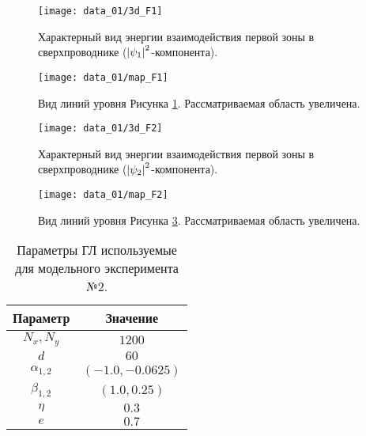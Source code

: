 \begin{figure}[h!]
    \center
    \texttt{[image: data\_01/3d\_F1]}
    \caption{Характерный вид энергии взаимодействия первой зоны в 
        сверхпроводнике (\( \left| \psi_1 \right|^2 \)-компонента).}
    \label{img:3d-band-1-01}
\end{figure}

\begin{figure}[h!]
    \center
    \texttt{[image: data\_01/map\_F1]}
    \caption{Вид линий уровня Рисунка \ref{img:3d-band-1-01}. 
        Рассматриваемая область увеличена.}
    \label{img:map-band-1-01}
\end{figure}

\begin{figure}[h!]
    \center
    \texttt{[image: data\_01/3d\_F2]}
    \caption{Характерный вид энергии взаимодействия первой зоны в 
        сверхпроводнике (\( \left| \psi_2 \right|^2 \)-компонента).}
    \label{img:3d-band-2-01}
\end{figure}

\begin{figure}[h!]
    \center
    \texttt{[image: data\_01/map\_F2]}
    \caption{Вид линий уровня Рисунка \ref{img:3d-band-2-01}. 
        Рассматриваемая область увеличена.}
    \label{img:map-band-2-01}
\end{figure}

\clearpage


\begin{table}[h!]
    \centering
    \begin{tabular}{|c|c|}
        \hline 
        Параметр           & Значение              \\ \hline
        \( N_x, N_y \)     & \( 1200 \)            \\ \hline
        \( d \)            & \( 60 \)              \\ \hline
        \( \alpha_{1,2} \) & \( (-1.0, -0.0625) \) \\ \hline
        \( \beta_{1,2} \)  & \( (1.0, 0.25) \)     \\ \hline
        \( \eta \)         & \( 0.3 \)             \\ \hline
        \( e \)            & \( 0.7 \)             \\ \hline
    \end{tabular}
    \caption{Параметры ГЛ используемые для модельного эксперимента №2.}
    \label{param:02}
\end{table}

